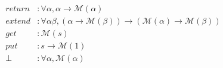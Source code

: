 {\scriptsize
\begin{align*}
  return &: ∀ α, α → ℳ (α)                       \\
  extend &: ∀ α β, (α → ℳ (β)) → (ℳ (α) → ℳ (β)) \\
  get &: ℳ (𝑠)     \\
  put &: 𝑠 → ℳ (1) \\
  ⊥ &: ∀ α, ℳ (α)
\end{align*}
}
